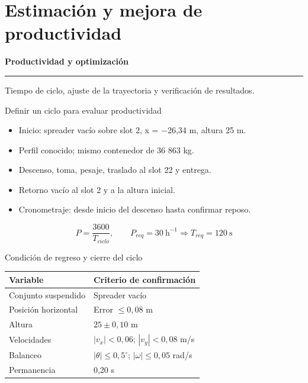 \documentclass[aspectratio=169,11pt]{beamer}
\begin{document}
\section{Estimación y mejora de productividad}
\begin{frame}[plain,label=seccion9]
\vfill
{\fontsize{25}{29}\selectfont\bfseries Productividad y optimización\par}
\vspace{4mm}\textcolor{accent}{\rule{.75\linewidth}{1pt}}\par\vspace{3mm}
{\large Tiempo de ciclo, ajuste de la trayectoria y verificación de resultados.\par}\vfill
{}
\end{frame}
\begin{frame}[t,label=slide74]{Definir un ciclo para evaluar productividad}
\begin{itemize}
\item Inicio: spreader vacío sobre slot 2, x = −26,34 m, altura 25 m.
\item Perfil conocido; mismo contenedor de 36 863 kg.
\item Descenso, toma, pesaje, traslado al slot 22 y entrega.
\item Retorno vacío al slot 2 y a la altura inicial.
\item Cronometraje: desde inicio del descenso hasta confirmar reposo.
\end{itemize}\[
P=\frac{3600}{T_{ciclo}},\qquad P_{req}=30\ \mathrm{h^{-1}}\Rightarrow T_{req}=120\ \mathrm{s}
\]

\end{frame}
\begin{frame}[t,label=slide75]{Condición de regreso y cierre del ciclo}
\begin{center}
{\small\renewcommand{\arraystretch}{1.0}
\begin{tabular}{p{4.5cm}p{9.1cm}}\toprule
Variable & Criterio de confirmación\\\midrule
Conjunto suspendido & Spreader vacío\\
Posición horizontal & Error $\leq0,08$ m\\
Altura & $25\pm0,10$ m\\
Velocidades & $|v_x|<0,06$; $|v_y|<0,08$ m/s\\
Balanceo & $|\theta|\leq0,5^\circ$; $|\omega|\leq0,05$ rad/s\\
Permanencia & 0,20 s\\
\bottomrule\end{tabular}}\end{center}

\end{frame}
\end{document}
